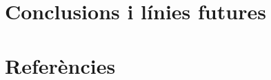 \documentclass{article}
\begin{document}
          
    \section{Conclusions i línies futures}
    
    \section{Referències}
\end{document}
